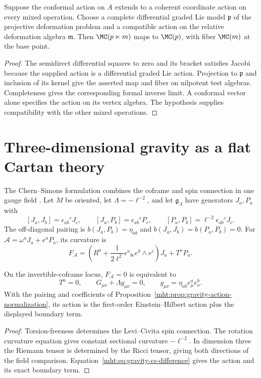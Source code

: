 \begin{theorem}
Suppose the conformal action on $A$ extends to a coherent
coordinate action on every mixed operation.
Choose a complete differential graded Lie model $\mathfrak p$
of the projective deformation problem and a compatible action
on the relative deformation algebra $\mathfrak m$.
Then $\MC(\mathfrak p\ltimes\mathfrak m)$ maps to $\MC(\mathfrak p)$,
with fiber $\MC(\mathfrak m)$ at the base point.
\end{theorem}
\begin{proof}
The semidirect differential squares to zero and its bracket
satisfies Jacobi because the supplied action is a differential
graded Lie action.
Projection to $\mathfrak p$ and inclusion of its kernel give
the asserted map and fiber on nilpotent test algebras.
Completeness gives the corresponding formal inverse limit.
A conformal vector alone specifies the action on its vertex
algebra. The hypothesis supplies compatibility with the other
mixed operations.
\end{proof}

\chapter{Three-dimensional gravity as a flat Cartan theory}
The Chern--Simons formulation combines the coframe and spin
connection in one gauge field
\cite{AchucarroTownsend,Witten3DGravity}.
Let $M$ be oriented, let $\Lambda=-\ell^{-2}$, and let
$\mathfrak g_\Lambda$ have generators $J_a,P_a$ with
\[
 [J_a,J_b]=\epsilon_{ab}{}^cJ_c,\qquad
 [J_a,P_b]=\epsilon_{ab}{}^cP_c,\qquad
 [P_a,P_b]=\ell^{-2}\epsilon_{ab}{}^cJ_c.
\]
The off-diagonal pairing is
$b(J_a,P_b)=\eta_{ab}$ and $b(J_a,J_b)=b(P_a,P_b)=0$.
For $\mathcal A=\omega^aJ_a+e^aP_a$, its curvature is
\[
 F_{\mathcal A}
 =\left(R^a+\frac1{2\ell^2}\epsilon^a{}_{bc}e^b\wedge e^c\right)J_a
 +T^aP_a.
\]

\begin{theorem}
On the invertible-coframe locus, $F_{\mathcal A}=0$ is equivalent to
\[
 T^a=0,\qquad G_{\mu\nu}+\Lambda g_{\mu\nu}=0,\qquad
 g_{\mu\nu}=\eta_{ab}e^a_\mu e^b_\nu.
\]
With the pairing and coefficients of
Proposition~\ref{mht:prop:gravity-action-normalization}, its action
is the first-order Einstein--Hilbert action plus the displayed
boundary term.
\end{theorem}
\begin{proof}
Torsion-freeness determines the Levi--Civita spin connection.
The rotation curvature equation gives constant sectional
curvature $-\ell^{-2}$.
In dimension three the Riemann tensor is determined by the
Ricci tensor, giving both directions of the field comparison.
Equation~\eqref{mht:eq:gravity-cs-difference} gives the action and
its exact boundary term.
\end{proof}

